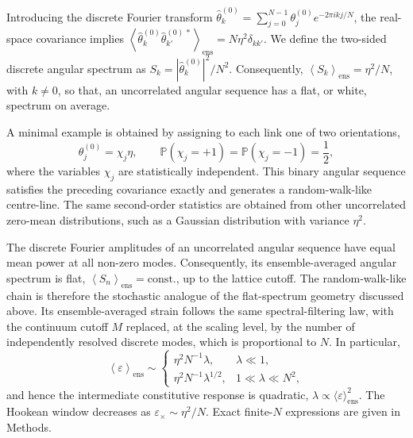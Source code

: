 \documentclass[pdflatex, twocolumn, sn-nature]{sn-jnl}
\begin{document}
Introducing the discrete Fourier transform $\widehat{\theta}^{(0)}_k
    =
    \sum_{j=0}^{N-1}
    \theta_j^{(0)}e^{-2\pi i k j/N}$, the real-space covariance implies $    \left\langle
    \widehat{\theta}^{(0)}_k
    \widehat{\theta}^{(0)\,*}_{k'}
    \right\rangle_{\mathrm{ens}}
    =
    N\eta^2\delta_{kk'}$.
We define the two-sided discrete angular spectrum as $S_k
    =
    \left|
    \widehat{\theta}^{(0)}_k
    \right|^2 / N^2 .$
Consequently, $    \left\langle S_k\right\rangle_{\mathrm{ens}}
    =
    \eta^2/N$, with $ k\neq0$,
so that, an uncorrelated angular sequence has a flat, or white, spectrum
on average.

A minimal example is obtained by assigning to each link one of two
orientations,
\begin{equation}
    \theta_j^{(0)}=\chi_j \eta,
    \qquad
    \mathbb P(\chi_j=+1)=\mathbb P(\chi_j=-1)=\frac{1}{2},
\end{equation}
where the variables $\chi_j$ are statistically independent. This
binary angular sequence satisfies the preceding covariance exactly and
generates a random-walk-like centre-line. The same second-order
statistics are obtained from other uncorrelated zero-mean
distributions, such as a Gaussian distribution with variance
$\eta^2$.

The discrete Fourier amplitudes of an uncorrelated angular sequence
have equal mean power at all non-zero modes. Consequently, its
ensemble-averaged angular spectrum is flat, $\left\langle S_n\right\rangle_{\mathrm{ens}}
    =\mathrm{const.}$,
up to the lattice cutoff. The random-walk-like chain is therefore the
stochastic analogue of the flat-spectrum geometry discussed above.
Its ensemble-averaged strain follows the same spectral-filtering law,
with the continuum cutoff $M$ replaced, at the scaling level, by the
number of independently resolved discrete modes, which is proportional
to $N$. In particular,
\begin{equation}
    \left\langle\varepsilon\right\rangle_{\mathrm{ens}}
    \sim
    \begin{cases}
        \displaystyle \eta^2 N^{-1}\lambda,
        & \lambda\ll 1,\\[4pt]
        \displaystyle \eta^2 N^{-1}\lambda^{1/2},
        & 1\ll\lambda\ll N^2,
    \end{cases}
\end{equation}
and hence the intermediate constitutive response is quadratic,
$\lambda\propto\langle\varepsilon\rangle_{\mathrm{ens}}^2$.
The Hookean window decreases as
$\varepsilon_\times\sim\eta^2/N$. Exact finite-$N$ expressions are given in Methods.
\end{document}
